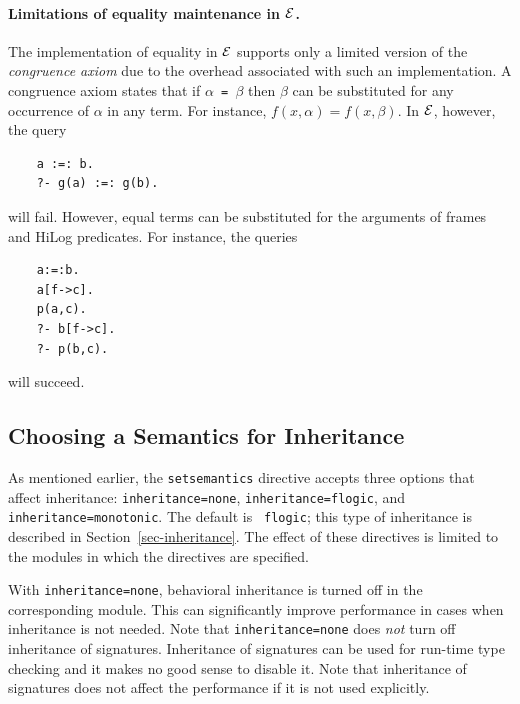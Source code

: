 \documentclass[11pt]{article}
\newcommand{\ERGO}{\mbox{\ensuremath{\cal{E}}\smaller{{\sc{RGO}}}}\xspace}
\newcommand{\FLSYSTEM}{\ERGO}
\begin{document}
\paragraph{Limitations of equality maintenance in \FLSYSTEM.}
The implementation of equality in \FLSYSTEM supports only a limited
version of the
\emph{congruence axiom} due to the overhead associated with such an
implementation. A congruence axiom states that if {\tt $\alpha$ = $\beta$}
then {\tt $\beta$} can be substituted for any occurrence of $\alpha$ in any
term. For instance, $f(x,\alpha) = f(x,\beta)$. In \FLSYSTEM, however, the query
\begin{verbatim}
    a :=: b.
    ?- g(a) :=: g(b).
\end{verbatim}
will fail. However,
equal terms can be substituted for the arguments of
frames and HiLog predicates. For instance, the queries
\begin{verbatim}
    a:=:b.
    a[f->c].
    p(a,c).
    ?- b[f->c].  
    ?- p(b,c).
\end{verbatim}
will succeed.


\subsection{Choosing a Semantics for Inheritance}\label{sec-inheritance-directive}

As mentioned earlier, the {\tt setsemantics} directive accepts three
options that affect inheritance:
{\tt inheritance=none}, {\tt inheritance=flogic}, and
\texttt{inheritance=monotonic}.  The default is {\tt
  flogic}; this type of inheritance is described in
Section~\ref{sec-inheritance}.
The effect of these directives is limited to the modules in which
the directives are specified.

With {\tt inheritance=none}, behavioral inheritance is turned off in the
corresponding module.  This can significantly improve performance in cases
when inheritance is not needed.
Note that {\tt inheritance=none} does \emph{not} turn off inheritance of
signatures. Inheritance of signatures can be used for run-time type checking
and it makes no good sense to disable it. Note that inheritance of
signatures does not affect the performance if it is not used explicitly.
\end{document}
